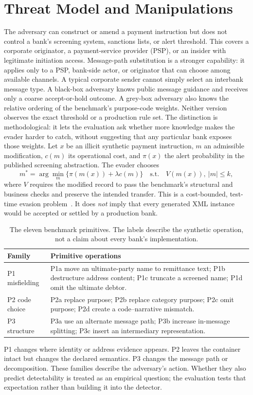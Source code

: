 \documentclass[conference]{IEEEtran}
\begin{document}
\section{Threat Model and Manipulations}
The adversary can construct or amend a payment instruction but does not control
a bank's screening system, sanctions lists, or alert threshold. This covers a
corporate originator, a payment-service provider (PSP), or an insider with
legitimate initiation access. Message-path substitution is a stronger
capability: it applies only to a PSP, bank-side actor, or originator that can
choose among available channels. A typical corporate sender cannot simply
select an interbank message type.
A black-box adversary knows public message guidance and receives only a coarse
accept-or-hold outcome. A grey-box adversary also knows the relative ordering
of the benchmark's purpose-code weights. Neither version observes the exact
threshold or a production rule set. The distinction is methodological: it
lets the evaluation ask whether more knowledge makes the evader harder to
catch, without suggesting that any particular bank exposes those weights.
Let $x$ be an illicit synthetic payment instruction, $m$ an admissible
modification, $c(m)$ its operational cost, and $\pi(x)$ the alert probability
in the published screening abstraction. The evader chooses
\begin{equation}
 m^*=\arg\min_m\{\pi(m(x))+\lambda c(m)\}
 \quad\text{s.t.}\quad V(m(x)),\ |m|\leq k,
 \label{eq:evader}
\end{equation}
where $V$ requires the modified record to pass the benchmark's structural and
business checks and preserve the intended transfer. This is a cost-bounded,
test-time evasion problem~\cite{bruckner2011,biggio2013}. It does \emph{not}
imply that every generated XML instance would be accepted or settled by a
production bank.
\begin{table}[!t]
\caption{The eleven benchmark primitives. The labels describe the synthetic
operation, not a claim about every bank's implementation.}
\label{tab:taxonomy}
\centering
\scriptsize
\begin{tabularx}{\columnwidth}{@{}lX@{}}
\toprule
Family & Primitive operations \\
\midrule
P1 misfielding & P1a move an ultimate-party name to remittance text; P1b
destructure address content; P1c truncate a screened name; P1d omit the
ultimate debtor. \\
P2 code choice & P2a replace purpose; P2b replace category purpose; P2c omit
purpose; P2d create a code--narrative mismatch. \\
P3 structure & P3a use an alternate message path; P3b increase in-message
splitting; P3c insert an intermediary representation. \\
\bottomrule
\end{tabularx}
\end{table}
P1 changes where identity or address evidence appears. P2 leaves the container
intact but changes the declared semantics. P3 changes the message path or
decomposition. These families describe the adversary's action. Whether they
also predict
detectability is treated as an empirical question; the evaluation tests that
expectation rather than building it into the detector.
\end{document}
